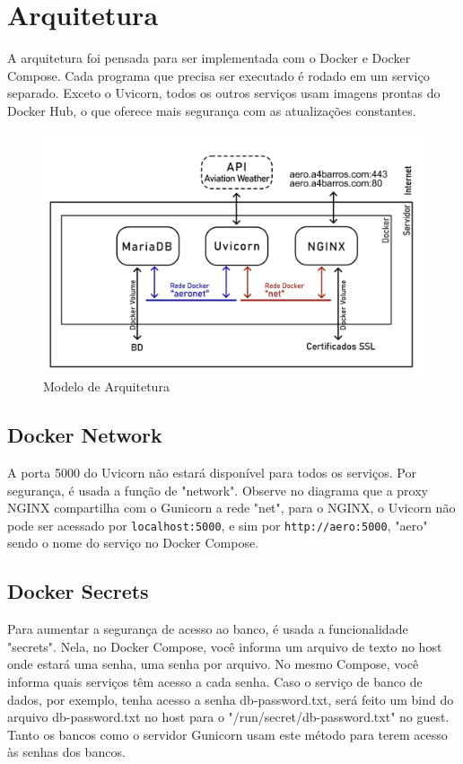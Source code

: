 \chapter{Arquitetura}

A arquitetura foi pensada para ser implementada com o Docker e Docker Compose. Cada
programa que precisa ser executado é rodado em um serviço separado. Exceto o Uvicorn,
todos os outros serviços usam imagens prontas do Docker Hub, o que oferece mais segurança
com as atualizações constantes.

\begin{figure}[ht]
    \begin{center}
    \includegraphics[width=\linewidth]{img/diagrama-arquitetura.png}
    \caption{Modelo de Arquitetura}
    \label{fig:arquitetura}
    \end{center}
\end{figure}

\section{Docker Network}
A porta 5000 do Uvicorn não estará disponível para todos os serviços. Por segurança, é usada a função de
"network". Observe no diagrama que a proxy NGINX compartilha com o Gunicorn a rede "net", para o NGINX,
o Uvicorn não pode ser acessado por \texttt{localhost:5000}, e sim por \texttt{http://aero:5000}, "aero"
sendo o nome do serviço no Docker Compose.


\section{Docker Secrets}

Para aumentar a segurança de acesso ao banco, é usada a funcionalidade "secrets". Nela, no Docker Compose,
você informa um arquivo de texto no host onde estará uma senha, uma senha por arquivo. No mesmo Compose,
você informa quais serviços têm acesso a cada senha. Caso o serviço de banco de dados, por exemplo, tenha
acesso a senha db-password.txt, será feito um bind do arquivo db-password.txt no host para o "/run/secret/db-password.txt"
no guest.
Tanto os bancos como o servidor Gunicorn usam este método para terem acesso às senhas dos bancos.

